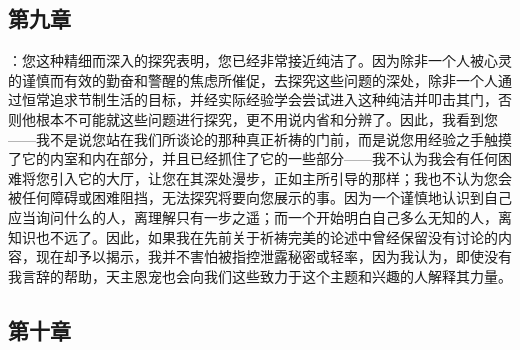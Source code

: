 \subsection{第九章}

\par

：您这种精细而深入的探究表明，您已经非常接近纯洁了。因为除非一个人被心灵的谨慎而有效的勤奋和警醒的焦虑所催促，去探究这些问题的深处，除非一个人通过恒常追求节制生活的目标，并经实际经验学会尝试进入这种纯洁并叩击其门，否则他根本不可能就这些问题进行探究，更不用说内省和分辨了。因此，我看到您——我不是说您站在我们所谈论的那种真正祈祷的门前，而是说您用经验之手触摸了它的内室和内在部分，并且已经抓住了它的一些部分——我不认为我会有任何困难将您引入它的大厅，让您在其深处漫步，正如主所引导的那样；我也不认为您会被任何障碍或困难阻挡，无法探究将要向您展示的事。因为一个谨慎地认识到自己应当询问什么的人，离理解只有一步之遥；而一个开始明白自己多么无知的人，离知识也不远了。因此，如果我在先前关于祈祷完美的论述中曾经保留没有讨论的内容，现在却予以揭示，我并不害怕被指控泄露秘密或轻率，因为我认为，即使没有我言辞的帮助，天主恩宠也会向我们这些致力于这个主题和兴趣的人解释其力量。\par


\subsection{第十章}

\par

